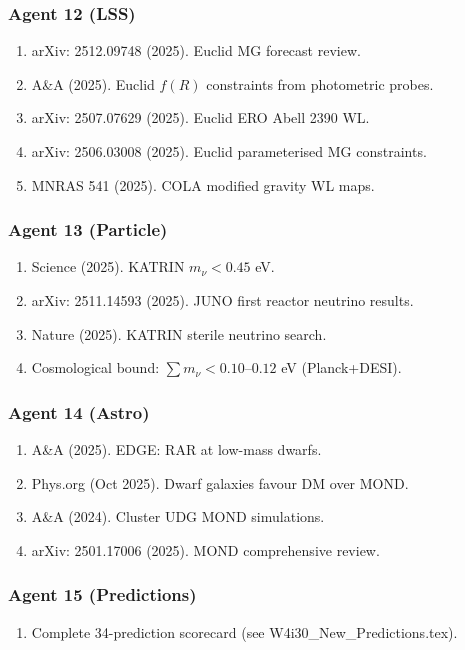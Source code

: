 \documentclass[11pt,a4paper]{article}
\begin{document}
\subsubsection{Agent 12 (LSS)}
\begin{enumerate}
\item arXiv: 2512.09748 (2025). Euclid MG forecast review.
\item A\&A (2025). Euclid $f(R)$ constraints from photometric probes.
\item arXiv: 2507.07629 (2025). Euclid ERO Abell 2390 WL.
\item arXiv: 2506.03008 (2025). Euclid parameterised MG constraints.
\item MNRAS 541 (2025). COLA modified gravity WL maps.
\end{enumerate}

\subsubsection{Agent 13 (Particle)}
\begin{enumerate}
\item Science (2025). KATRIN $m_\nu < 0.45$ eV.
\item arXiv: 2511.14593 (2025). JUNO first reactor neutrino results.
\item Nature (2025). KATRIN sterile neutrino search.
\item Cosmological bound: $\sum m_\nu < 0.10$--$0.12$ eV (Planck+DESI).
\end{enumerate}

\subsubsection{Agent 14 (Astro)}
\begin{enumerate}
\item A\&A (2025). EDGE: RAR at low-mass dwarfs.
\item Phys.org (Oct 2025). Dwarf galaxies favour DM over MOND.
\item A\&A (2024). Cluster UDG MOND simulations.
\item arXiv: 2501.17006 (2025). MOND comprehensive review.
\end{enumerate}

\subsubsection{Agent 15 (Predictions)}
\begin{enumerate}
\item Complete 34-prediction scorecard (see W4i30\_New\_Predictions.tex).
\end{enumerate}
\end{document}
